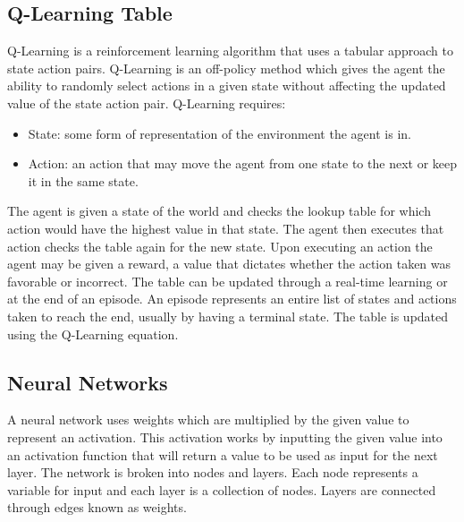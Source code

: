 \subsection{Q-Learning Table}
Q-Learning is a reinforcement learning algorithm that uses a tabular approach to state action pairs. Q-Learning is an off-policy method which gives the agent the ability to randomly select actions in a given state without affecting the updated value of the state action pair. Q-Learning requires:
\begin{itemize}
\item State: some form of representation of the environment the agent is in.
\item Action: an action that may move the agent from one state to the next or keep it in the same state.
\end{itemize}
The agent is given a state of the world and checks the lookup table for which action would have the highest value in that state. The agent then executes that action checks the table again for the new state. Upon executing an action the agent may be given a reward, a value that dictates whether the action taken was favorable or incorrect.
The table can be updated through a real-time learning or at the end of an episode. An episode represents an entire list of states and actions taken to reach the end, usually by having a terminal state. The table is updated using the Q-Learning equation.

\subsection{Neural Networks}
A neural network uses weights which are multiplied by the given value to represent an activation. This activation works by inputting the given value into an activation function that will return a value to be used as input for the next layer. The network is broken into nodes and layers. Each node represents a variable for input and each layer is a collection of nodes. Layers are connected through edges known as weights.

